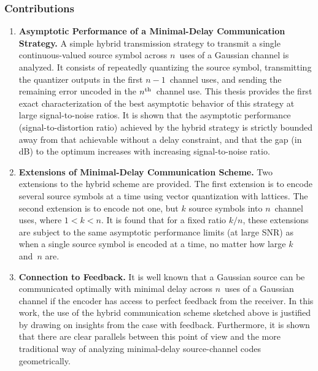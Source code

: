 \subsubsection{Contributions}

\begin{enumerate}

  \item \textbf{Asymptotic Performance of a Minimal-Delay Communication
    Strategy.} A simple hybrid transmission strategy to transmit a single
    continuous-valued source symbol across $n$~uses of a Gaussian channel is
    analyzed. It consists of repeatedly quantizing the source symbol,
    transmitting the quantizer outputs in the first $n-1$~channel uses, and
    sending the remaining error uncoded in the $n{^{\text{th}}}$~channel use. This thesis
    provides the first exact characterization of the best asymptotic behavior of
    this strategy at large signal-to-noise ratios. It is shown that the
    asymptotic performance (signal-to-distortion ratio) achieved by the hybrid
    strategy is strictly bounded away from that achievable without a delay
    constraint, and that the gap (in dB) to the optimum increases with
    increasing signal-to-noise ratio.

  \item \textbf{Extensions of Minimal-Delay Communication Scheme.} Two
    extensions to the hybrid scheme are provided. The first extension is to
    encode several source symbols at a time using vector quantization with
    lattices. The second extension is to encode not one, but $k$ source symbols
    into $n$~channel uses, where $1 < k < n$. It is found that for a fixed ratio
    $k/n$, these extensions are subject to the same asymptotic performance
    limits (at large SNR) as when a single source symbol is encoded at a time,
    no matter how large $k$ and~$n$ are.

  \item \textbf{Connection to Feedback.} It is well known that a Gaussian source
    can be communicated optimally with minimal delay across $n$~uses of a
    Gaussian channel if the encoder has access to perfect feedback from the
    receiver. In this work,  the use of the hybrid communication scheme sketched
    above is justified by drawing on insights from the case with feedback.
    Furthermore, it is shown that there are clear parallels between this point
    of view and the more traditional way of analyzing minimal-delay
    source-channel codes geometrically. 


\end{enumerate}

